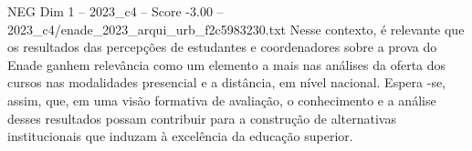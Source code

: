 \begin{textsample}{NEG Dim 1 – 2023\_c4 – Score -3.00 – 2023\_c4/enade\_2023\_arqui\_urb\_f2c5983230.txt}
Nesse contexto, é relevante que os resultados das percepções de estudantes e coordenadores sobre a prova do Enade ganhem relevância como um elemento a mais nas análises da oferta dos cursos nas modalidades presencial e a distância, em nível nacional.
Espera -se, assim, que, em uma visão formativa de avaliação, o conhecimento e a análise desses resultados possam contribuir para a construção de alternativas institucionais que induzam à excelência da educação superior.

\end{textsample}
